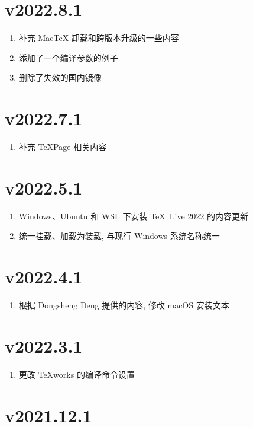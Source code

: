 \section*{v2022.8.1}

\begin{enumerate}
  \item 补充 Mac\TeX{} 卸载和跨版本升级的一些内容
  \item 添加了一个编译参数的例子
  \item 删除了失效的国内镜像
\end{enumerate}

\section*{v2022.7.1}

\begin{enumerate}
  \item 补充 TeXPage 相关内容
\end{enumerate}

\section*{v2022.5.1}

\begin{enumerate}
  \item Windows、Ubuntu 和 WSL 下安装 \TeX\ Live 2022 的内容更新
  \item 统一挂载、加载为装载, 与现行 Windows 系统名称统一
\end{enumerate}

\section*{v2022.4.1}

\begin{enumerate}
  \item 根据 Dongsheng Deng 提供的内容, 修改 macOS 安装文本
\end{enumerate}

\section*{v2022.3.1}

\begin{enumerate}
  \item 更改 \TeX works 的编译命令设置
\end{enumerate}

\section*{v2021.12.1}

